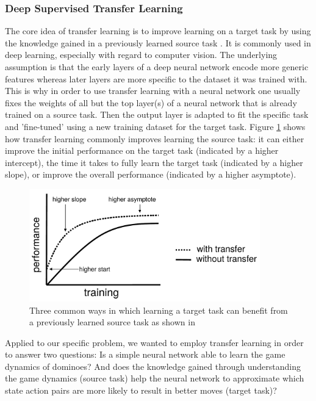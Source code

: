 \documentclass[12pt,a4paper]{article}
\begin{document}
\subsubsection{Deep Supervised Transfer Learning}
The core idea of transfer learning is to improve learning on a target task by using the knowledge gained in a previously learned source task \citep{olivas_transfer_2010}. It is commonly used in deep learning, especially with regard to computer vision. The underlying assumption is that the early layers of a deep neural network encode more generic features whereas later layers are more specific to the dataset it was trained with. This is why in order to use transfer learning with a neural network one usually fixes the weights of all but the top layer(s) of a neural network that is already trained on a source task. Then the output layer is adapted to fit the specific task and 'fine-tuned' using a new training dataset for the target task. Figure \ref{fig:trnsfr_bttr} shows how transfer learning commonly improves learning the source task: it can either improve the initial performance on the target task (indicated by a higher intercept), the time it takes to fully learn the target task (indicated by a higher slope), or improve the overall performance (indicated by a higher asymptote).

\begin{figure}
  \includegraphics[width=10cm]{img/trnsfr_bttr.png}
  \centering 
  \caption{Three common ways in which learning a target task can benefit from a previously learned source task as shown in \citet{olivas_transfer_2010}}
  \label{fig:trnsfr_bttr}
\end{figure}

Applied to our specific problem, we wanted to employ transfer learning in order to answer two questions: Is a simple neural network able to learn the game dynamics of dominoes? And does the knowledge gained through understanding the game dynamics (source task) help the neural network to approximate which state action pairs are more likely to result in better moves (target task)?
\end{document}
